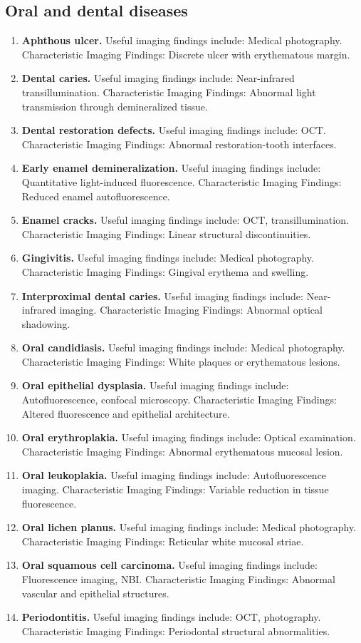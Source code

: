 \subsection{Oral and dental diseases}
\begin{enumerate}[leftmargin=*,itemsep=0.45em,topsep=0.4em]
\item \textbf{Aphthous ulcer.} Useful imaging findings include: Medical photography. Characteristic Imaging Findings: Discrete ulcer with erythematous margin.
\item \textbf{Dental caries.} Useful imaging findings include: Near-infrared transillumination. Characteristic Imaging Findings: Abnormal light transmission through demineralized tissue.
\item \textbf{Dental restoration defects.} Useful imaging findings include: OCT. Characteristic Imaging Findings: Abnormal restoration-tooth interfaces.
\item \textbf{Early enamel demineralization.} Useful imaging findings include: Quantitative light-induced fluorescence. Characteristic Imaging Findings: Reduced enamel autofluorescence.
\item \textbf{Enamel cracks.} Useful imaging findings include: OCT, transillumination. Characteristic Imaging Findings: Linear structural discontinuities.
\item \textbf{Gingivitis.} Useful imaging findings include: Medical photography. Characteristic Imaging Findings: Gingival erythema and swelling.
\item \textbf{Interproximal dental caries.} Useful imaging findings include: Near-infrared imaging. Characteristic Imaging Findings: Abnormal optical shadowing.
\item \textbf{Oral candidiasis.} Useful imaging findings include: Medical photography. Characteristic Imaging Findings: White plaques or erythematous lesions.
\item \textbf{Oral epithelial dysplasia.} Useful imaging findings include: Autofluorescence, confocal microscopy. Characteristic Imaging Findings: Altered fluorescence and epithelial architecture.
\item \textbf{Oral erythroplakia.} Useful imaging findings include: Optical examination. Characteristic Imaging Findings: Abnormal erythematous mucosal lesion.
\item \textbf{Oral leukoplakia.} Useful imaging findings include: Autofluorescence imaging. Characteristic Imaging Findings: Variable reduction in tissue fluorescence.
\item \textbf{Oral lichen planus.} Useful imaging findings include: Medical photography. Characteristic Imaging Findings: Reticular white mucosal striae.
\item \textbf{Oral squamous cell carcinoma.} Useful imaging findings include: Fluorescence imaging, NBI. Characteristic Imaging Findings: Abnormal vascular and epithelial structures.
\item \textbf{Periodontitis.} Useful imaging findings include: OCT, photography. Characteristic Imaging Findings: Periodontal structural abnormalities.
\end{enumerate}

